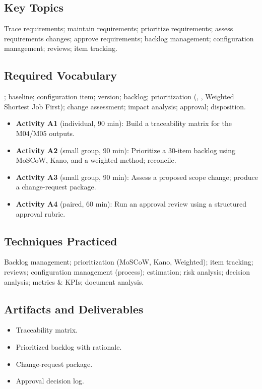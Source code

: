 \documentclass[11pt,letterpaper,oneside]{report}
\begin{document}
\subsection*{Key Topics}
Trace requirements; maintain requirements; prioritize requirements; assess requirements changes; approve requirements; backlog management; configuration management; reviews; item tracking.

\subsection*{Required Vocabulary}
; baseline; configuration item; version; backlog; prioritization (, , Weighted Shortest Job First); change assessment; impact analysis; approval; disposition.

\begin{labbox}
\begin{itemize}
  \item \textbf{Activity A1} (individual, 90 min): Build a traceability matrix for the M04/M05 outputs.
  \item \textbf{Activity A2} (small group, 90 min): Prioritize a 30-item backlog using MoSCoW, Kano, and a weighted method; reconcile.
  \item \textbf{Activity A3} (small group, 90 min): Assess a proposed scope change; produce a change-request package.
  \item \textbf{Activity A4} (paired, 60 min): Run an approval review using a structured approval rubric.
\end{itemize}
\end{labbox}

\subsection*{Techniques Practiced}
Backlog management; prioritization (MoSCoW, Kano, Weighted); item tracking; reviews; configuration management (process); estimation; risk analysis; decision analysis; metrics \& KPIs; document analysis.

\subsection*{Artifacts and Deliverables}
\begin{itemize}
  \item Traceability matrix.
  \item Prioritized backlog with rationale.
  \item Change-request package.
  \item Approval decision log.
\end{itemize}
\end{document}
